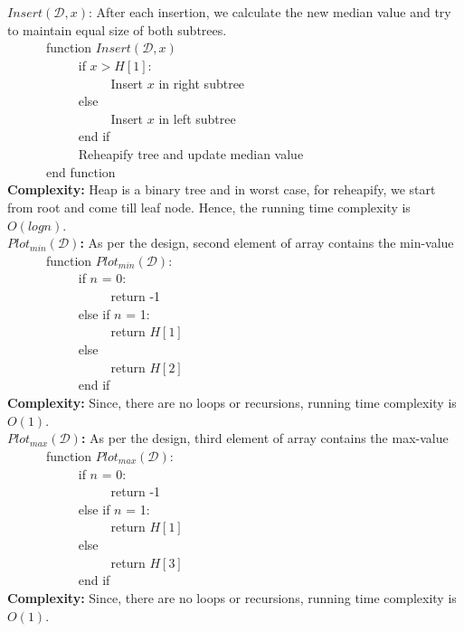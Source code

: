 \documentclass[12pt]{article}
\begin{document}
\begin{enumerate}
\begin{itemize}
\textbf{$Insert(\mathcal{D}, x)$}: After each insertion, we calculate the new median value and try to maintain equal size of both subtrees.\\
\verb|		|function $Insert(\mathcal{D}, x)$\\
\verb|		|\verb|		|if $x > H[1]$:\\
\verb|		|\verb|		|\verb|		|Insert $x$ in right subtree\\
\verb|		|\verb|		|else\\
\verb|		|\verb|		|\verb|		|Insert $x$ in left subtree\\
\verb|		|\verb|		|end if\\
\verb|		|\verb|		|Reheapify tree and update median value\\
\verb|		|end function\\
\textbf{Complexity:} Heap is a binary tree and in worst case, for reheapify, we start from root and come till leaf node. Hence, the running time complexity is $O(logn)$.\\


\textbf{$Plot_{min}(\mathcal{D})$:} As per the design, second element of array contains the min-value\\
\verb|		|function $Plot_{min}(\mathcal{D})$:\\
\verb|		|\verb|		|if $n$ = 0:\\
\verb|		|\verb|		|\verb|		|return -1\\
\verb|		|\verb|		|else if $n$ = 1:\\
\verb|		|\verb|		|\verb|		|return $H[1]$\\
\verb|		|\verb|		|else \\
\verb|		|\verb|		|\verb|		|return $H[2]$\\
\verb|		|\verb|		|end if\\
\textbf{Complexity:} Since, there are no loops or recursions, running time complexity is $O(1)$.\\

\textbf{$Plot_{max}(\mathcal{D})$:} As per the design, third element of array contains the max-value\\
\verb|		|function $Plot_{max}(\mathcal{D})$:\\
\verb|		|\verb|		|if $n$ = 0:\\
\verb|		|\verb|		|\verb|		|return -1\\
\verb|		|\verb|		|else if $n$ = 1:\\
\verb|		|\verb|		|\verb|		|return $H[1]$\\
\verb|		|\verb|		|else \\
\verb|		|\verb|		|\verb|		|return $H[3]$\\
\verb|		|\verb|		|end if\\
\textbf{Complexity:} Since, there are no loops or recursions, running time complexity is $O(1)$.\\


\end{itemize}
\end{enumerate}
\end{document}
